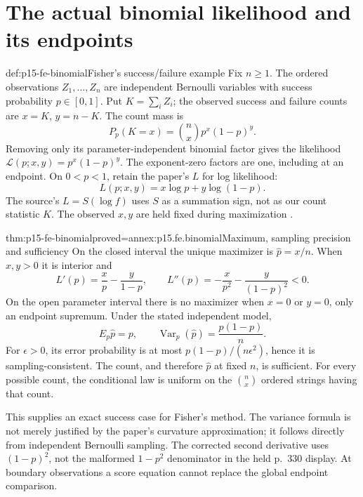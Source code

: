 \section{The actual binomial likelihood and its endpoints}

\begin{hbdefinition}{def:p15-fe-binomial}{Fisher's success/failure example}
Fix \(n\geq1\). The ordered observations \(Z_1,\ldots,Z_n\)
are independent Bernoulli variables with success probability
\(p\in[0,1]\). Put \(K=\sum_iZ_i\); the observed success and
failure counts are \(x=K\), \(y=n-K\).
The count mass is
\[
  P_p(K=x)=\binom nx p^x(1-p)^y.
\]
Removing only its parameter-independent binomial factor gives the
likelihood \(\mathcal L(p;x,y)=p^x(1-p)^y\).
The exponent-zero factors are one, including at an endpoint.
On \(0<p<1\), retain the paper's \(L\) for log likelihood:
\[
  L(p;x,y)=x\log p+y\log(1-p).
\]
The source's \(L=S(\log f)\) uses \(S\) as a summation sign,
not as our count statistic \(K\). The observed \(x,y\) are held
fixed during maximization \cite[pp.~323--324,331]{Fisher1922Foundations}.
\end{hbdefinition}

\begin{hbtheorem}{thm:p15-fe-binomial}{proved=annex:p15.fe.binomial}{Maximum, sampling precision and sufficiency}
On the closed interval the unique maximizer is \(\widehat p=x/n\).
When \(x,y>0\) it is interior and
\[
 L'(p)=\frac{x}{p}-\frac{y}{1-p},\qquad
 L''(p)=-\frac{x}{p^2}-\frac{y}{(1-p)^2}<0.
\]
On the open parameter interval there is no maximizer when \(x=0\)
or \(y=0\), only an endpoint supremum.
Under the stated independent model,
\[
 E_p\widehat p=p,\qquad
 \operatorname{Var}_p(\widehat p)=\frac{p(1-p)}n.
\]
For \(\epsilon>0\), its error probability is at most
\(p(1-p)/(n\epsilon^2)\), hence it is sampling-consistent.
The count, and therefore \(\widehat p\) at fixed \(n\), is sufficient.
For every possible count, the conditional law is uniform on the
\(\binom nx\) ordered strings having that count.
\end{hbtheorem}

This supplies an exact success case for Fisher's method. The variance
formula is not merely justified by the paper's curvature approximation;
it follows directly from independent Bernoulli sampling. The corrected
second derivative uses \((1-p)^2\), not the malformed
\(1-p^2\) denominator in the held p.~330 display. At boundary observations
a score equation cannot replace the global endpoint comparison.

